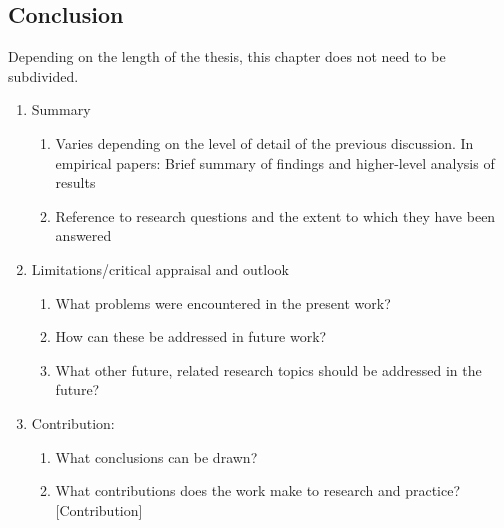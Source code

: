\subsection{Conclusion}
Depending on the length of the thesis, this chapter does not need to be subdivided.
\begin{enumerate}
    \item Summary
    \begin{enumerate}
        \item Varies depending on the level of detail of the previous discussion. In empirical papers: Brief summary of findings and higher-level analysis of results
        \item Reference to research questions and the extent to which they have been answered
    \end{enumerate}
    \item Limitations/critical appraisal and outlook
    \begin{enumerate}
        \item What problems were encountered in the present work?
        \item How can these be addressed in future work?
        \item What other future, related research topics should be addressed in the future?
    \end{enumerate}
    \item Contribution:
    \begin{enumerate}
        \item What conclusions can be drawn?
        \item What contributions does the work make to research and practice? [Contribution]
    \end{enumerate}
\end{enumerate}





